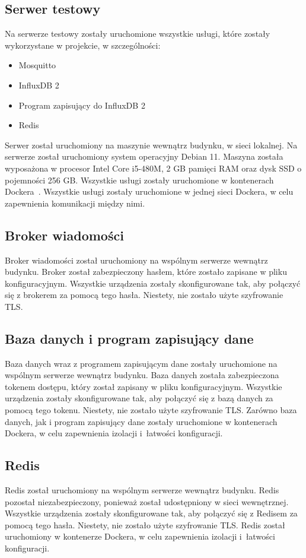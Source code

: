 \subsection{Serwer testowy}
Na serwerze testowy zostały uruchomione wszystkie usługi, które zostały wykorzystane w projekcie, w szczególności:
\begin{itemize}
    \item Mosquitto
    \item InfluxDB 2
    \item Program zapisujący do InfluxDB 2
    \item Redis
\end{itemize}
Serwer został uruchomiony na maszynie wewnątrz budynku, w sieci lokalnej. Na serwerze został uruchomiony system operacyjny Debian 11. Maszyna została wyposażona w procesor Intel Core i5-480M, 2 GB pamięci RAM oraz dysk SSD o pojemności 256 GB. Wszystkie usługi zostały uruchomione w kontenerach Dockera~\cite{tools:docker}. Wszystkie usługi zostały uruchomione w jednej sieci Dockera, w celu zapewnienia komunikacji między nimi.

\subsection{Broker wiadomości}
Broker wiadomości został uruchomiony na wspólnym serwerze wewnątrz budynku. Broker został zabezpieczony hasłem, które zostało zapisane w pliku konfiguracyjnym. Wszystkie urządzenia zostały skonfigurowane tak, aby połączyć się z brokerem za pomocą tego hasła. Niestety, nie zostało użyte szyfrowanie TLS.

\subsection{Baza danych i program zapisujący dane}
Baza danych wraz z programem zapisującym dane zostały uruchomione na wspólnym serwerze wewnątrz budynku. Baza danych została zabezpieczona tokenem dostępu, który został zapisany w pliku konfiguracyjnym. Wszystkie urządzenia zostały skonfigurowane tak, aby połączyć się z bazą danych za pomocą tego tokenu. Niestety, nie zostało użyte szyfrowanie TLS. Zarówno baza danych, jak i program zapisujący dane zostały uruchomione w kontenerach Dockera, w celu zapewnienia izolacji i~łatwości konfiguracji.

\subsection{Redis}
Redis został uruchomiony na wspólnym serwerze wewnątrz budynku. Redis pozostał niezabezpieczony, ponieważ został udostępniony w sieci wewnętrznej. Wszystkie urządzenia zostały skonfigurowane tak, aby połączyć się z Redisem za pomocą tego hasła. Niestety, nie zostało użyte szyfrowanie TLS. Redis został uruchomiony w kontenerze Dockera, w celu zapewnienia izolacji i~łatwości konfiguracji.

